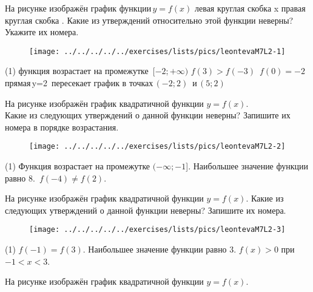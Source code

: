 %
%

\begin{class}[number=2]
	\begin{listofex}
		\item На рисунке изображён график функции \( y=f(x) \) левая круглая скобка x правая круглая скобка . Какие из утверждений относительно этой функции неверны? Укажите их номера.
		\begin{figure}[h!]
			\centering
			\texttt{[image: ../../../../../exercises/lists/pics/leontevaM7L2-1]}
		\end{figure}
		\begin{tasks}(1)
			\task функция возрастает на промежутке  \( [-2; +\infty) \)
			\task \( f(3)> f(-3)  \)
			\task \( f(0) = -2 \)
			\task прямая y=2  пересекает график в точках \(  (-2; 2) \)  и \( (5; 2) \) 
		\end{tasks}
		\item На рисунке изображён график квадратичной функции \( y  =  f(x) \).
		\\
		Какие из следующих утверждений о данной функции неверны? Запишите их номера в порядке возрастания.
		\begin{figure}[h!]
			\centering
			\texttt{[image: ../../../../../exercises/lists/pics/leontevaM7L2-2]}
		\end{figure}
		\begin{tasks}(1)
			\task Функция возрастает на промежутке \( (-\infty;  -1 \)].
			\task Наибольшее значение функции равно \( 8 \).
			\task \( f(-4) \neq f(2) \).
		\end{tasks}
	\newpage
	\item На рисунке изображён график квадратичной функции \( y =  f(x) \).
	Какие из следующих утверждений о данной функции неверны? Запишите их номера.
	\begin{figure}[h!]
		\centering
		\texttt{[image: ../../../../../exercises/lists/pics/leontevaM7L2-3]}
	\end{figure}
	\begin{tasks}(1)
		\task \( f(-1)=f(3) \).
		\task Наибольшее значение функции равно \( 3 \).
		\task \( f(x)>0  \) при  \( -1<x<3 \).
	\end{tasks}
	\item На рисунке изображён график квадратичной функции \( y = f(x) \).
	

\end{listofex}
\end{class}
